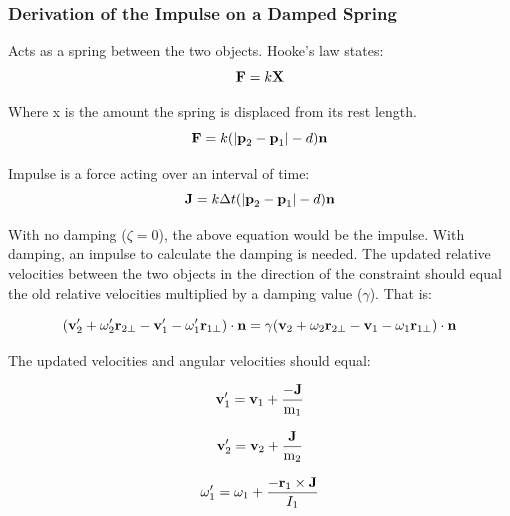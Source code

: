 \documentclass[12pt]{article}
\begin{document}
\subsubsection{Derivation of the Impulse on a Damped Spring}
Acts as a spring between the two objects. Hooke's law states:
\begin{equation*}
\textbf F = k\textbf X
\end{equation*}

\noindent
Where x is the amount the spring is displaced from its rest length. 
\begin{equation*}
\textbf F = k(|\textbf p_\text{2} - \textbf p_\text{1}| - d)\textbf n
\end{equation*}

\noindent
Impulse is a force acting over an interval of time: 
\begin{equation}
\textbf J = k\Delta t(|\textbf p_\text{2} - \textbf p_\text{1}| - d)\textbf n
\label{eq:hooke}
\end{equation}

\noindent
With no damping ($\zeta=0$), the above equation would be the impulse. 
With damping, an impulse to calculate the damping is needed.
The updated relative velocities 
between the two objects in the direction of the constraint should 
equal the old relative velocities multiplied by a damping value ($\gamma$).
That is:

\begin{equation}
(\textbf v'_\text{2} + \omega'_\text{2}\textbf r_\text{2$\perp$} - \textbf
v'_\text{1} - \omega'_\text{1}\textbf r_\text{1$\perp$}) \cdot \textbf n =
\gamma(\textbf v_\text{2} + \omega_\text{2}\textbf r_\text{2$\perp$} - \textbf
v_\text{1} - \omega_\text{1}\textbf r_\text{1$\perp$}) \cdot \textbf n
\label{eq:rv_s}
\end{equation}

\noindent
The updated velocities and angular velocities should equal:

\begin{equation*}
\bf v'_\text{1} =  v_\text{1} + \frac{-J}{ \textnormal m_\text{1}}
\end{equation*}

\begin{equation*}
\bf v'_\text{2} =  v_\text{2} + \frac{J}{ \textnormal m_\text{2}}
  \end{equation*}
  

\begin{equation*}
\omega'_\text{1} = \omega_\text{1} + \frac{-\textbf r_\text{1} \times \textbf
J}{I_\text{1}}
  \end{equation*}
  
\end{document}
